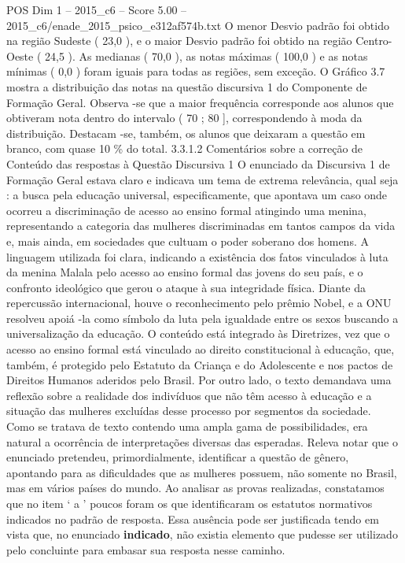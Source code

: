 \begin{textsample}{POS Dim 1 – 2015\_c6 – Score 5.00 – 2015\_c6/enade\_2015\_psico\_e312af574b.txt}
O menor Desvio padrão foi obtido na região Sudeste ( 23,0 ), e o maior Desvio padrão foi obtido na região Centro-Oeste ( 24,5 ).
As medianas ( 70,0 ), as notas máximas ( 100,0 ) e as notas mínimas ( 0,0 ) foram iguais para todas as regiões, sem exceção.
O Gráfico 3.7 mostra a distribuição das notas na questão discursiva 1 do Componente de Formação Geral.
Observa -se que a maior frequência corresponde aos alunos que obtiveram nota dentro do intervalo ( 70 ; 80 ], correspondendo à moda da distribuição.
Destacam -se, também, os alunos que deixaram a questão em branco, com quase 10 \% do total. 3.3.1.2 Comentários sobre a correção de Conteúdo das respostas à Questão Discursiva 1 O enunciado da Discursiva 1 de Formação Geral estava claro e indicava um tema de extrema relevância, qual seja : a busca pela educação universal, especificamente, que apontava um caso onde ocorreu a discriminação de acesso ao ensino formal atingindo uma menina, representando a categoria das mulheres discriminadas em tantos campos da vida e, mais ainda, em sociedades que cultuam o poder soberano dos homens.
A linguagem utilizada foi clara, indicando a existência dos fatos vinculados à luta da menina Malala pelo acesso ao ensino formal das jovens do seu país, e o confronto ideológico que gerou o ataque à sua integridade física.
Diante da repercussão internacional, houve o reconhecimento pelo prêmio Nobel, e a ONU resolveu apoiá -la como símbolo da luta pela igualdade entre os sexos buscando a universalização da educação.
O conteúdo está integrado às Diretrizes, vez que o acesso ao ensino formal está vinculado ao direito constitucional à educação, que, também, é protegido pelo Estatuto da Criança e do Adolescente e nos pactos de Direitos Humanos aderidos pelo Brasil.
Por outro lado, o texto demandava uma reflexão sobre a realidade dos indivíduos que não têm acesso à educação e a situação das mulheres excluídas desse processo por segmentos da sociedade.
Como se tratava de texto contendo uma ampla gama de possibilidades, era natural a ocorrência de interpretações diversas das esperadas.
Releva notar que o enunciado pretendeu, primordialmente, identificar a questão de gênero, apontando para as dificuldades que as mulheres possuem, não somente no Brasil, mas em vários países do mundo.
Ao analisar as provas realizadas, constatamos que no item ‘ a ’ poucos foram os que identificaram os estatutos normativos indicados no padrão de resposta.
Essa ausência pode ser justificada tendo em vista que, no enunciado \textbf{indicado}, não existia elemento que pudesse ser utilizado pelo concluinte para embasar sua resposta nesse caminho.

\end{textsample}
